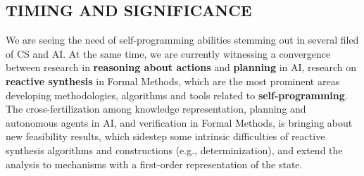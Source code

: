 







\subsection*{TIMING AND SIGNIFICANCE}


We are seeing the need of self-programming abilities stemming out in several filed of CS and AI. 
At the same time, we are currently witnessing a convergence between
research in \textbf{reasoning about actions} and \textbf{planning} in
AI, research on \textbf{reactive synthesis} in Formal Methods, which
are the most prominent areas developing methodologies, algorithms and
tools related to \textbf{self-programming}. The cross-fertilization
among knowledge representation, planning and autonomous agents in AI,
and verification in Formal Methods, is bringing about new feasibility
results, which sidestep some intrinsic difficulties of reactive
synthesis algorithms and constructions (e.g., determinization), and
extend the analysis to mechanisms with a first-order representation of
the state.

